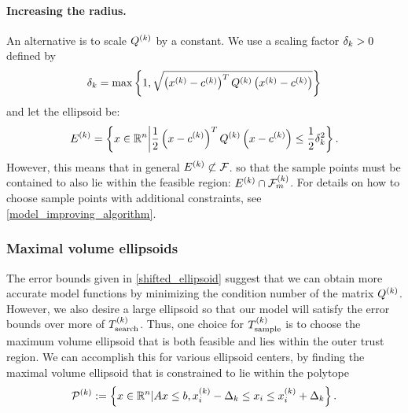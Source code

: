 \documentclass{article}
\begin{document}
\paragraph*{Increasing the radius.}
An alternative is to scale ${Q^{(k)}}$ by a constant.
We use a scaling factor $\delta_k > 0$ defined by
\begin{align*}
\delta_k = \max \left\{1, \sqrt{\left(x^{(k)} - c^{(k)} \right)^T {Q^{(k)}} \left(x^{(k)} - c^{(k)} \right)} \right\}
\end{align*}
and let the ellipsoid be:
\begin{align*}
{E^{(k)}} = \left\{x \in \mathbb R^n \bigg| \frac 1 2 \left(x - c^{(k)}\right)^T {Q^{(k)}} \left(x - c^{(k)}\right) \le \frac 1 2 \delta_k^2\right\}.
\end{align*}
However, this means that in general ${E^{(k)}} \not \subset {\mathcal F}$.
so that the sample points must be contained to also lie within the feasible region: ${E^{(k)}} \cap {\mathcal F_m^{(k)}}$.
For details on how to choose sample points with additional constraints, see \cref{model_improving_algorithm}.




\subsubsection{Maximal volume ellipsoids}
\label{ellipse_optimization}

The error bounds given in \cref{shifted_ellipsoid} suggest that we can obtain more accurate model functions by 
minimizing the condition number of the matrix ${Q^{(k)}}$.
However, we also desire a large ellipsoid so that our model will satisfy the error bounds over more of ${T_{\text{search}}^{(k)}}$.
Thus, one choice for ${T_{\text{sample}}^{(k)}}$ is to choose the maximum volume ellipsoid that is both feasible and lies within the outer trust region.
We can accomplish this for various ellipsoid centers, by finding the maximal volume ellipsoid that is constrained to lie within the polytope
\begin{align*}
{{\mathcal{P}}^{(k)}} := \left\{x \in \mathbb R^n | {A} x\le {b},   x_i^{(k)} - \Delta_k \le x_i \le x_i^{(k)} + \Delta_k\right\}.
\end{align*}
\end{document}

